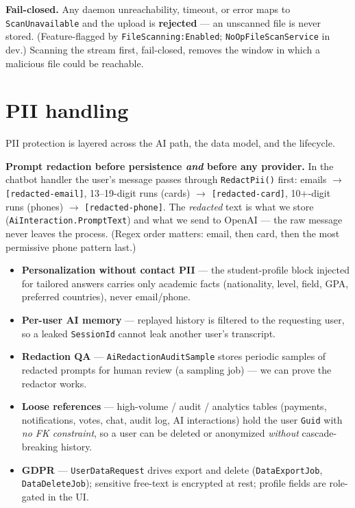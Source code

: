 \documentclass[11pt,a4paper]{article}
\newcommand{\code}[1]{\texttt{\textcolor{spInk}{#1}}}
\begin{document}
\begin{secbox}
\textbf{Fail-closed.} Any daemon unreachability, timeout, or error maps to
\code{ScanUnavailable} and the upload is \textbf{rejected} --- an unscanned file is
never stored. (Feature-flagged by \code{FileScanning:Enabled}; \code{NoOpFileScanService}
in dev.) Scanning the stream first, fail-closed, removes the window in which a
malicious file could be reachable.
\end{secbox}

\section{PII handling}
PII protection is layered across the AI path, the data model, and the lifecycle.

\begin{howbox}
\textbf{Prompt redaction before persistence \emph{and} before any provider.} In
the chatbot handler the user's message passes through \code{RedactPii()} first:
emails $\rightarrow$ \code{[redacted-email]}, 13--19-digit runs (cards)
$\rightarrow$ \code{[redacted-card]}, 10+-digit runs (phones) $\rightarrow$
\code{[redacted-phone]}. The \emph{redacted} text is what we store
(\code{AiInteraction.PromptText}) and what we send to OpenAI --- the raw message
never leaves the process. (Regex order matters: email, then card, then the most
permissive phone pattern last.)
\end{howbox}

\begin{itemize}
\item \textbf{Personalization without contact PII} --- the student-profile block
  injected for tailored answers carries only academic facts (nationality, level,
  field, GPA, preferred countries), never email/phone.
\item \textbf{Per-user AI memory} --- replayed history is filtered to the requesting
  user, so a leaked \code{SessionId} cannot leak another user's transcript.
\item \textbf{Redaction QA} --- \code{AiRedactionAuditSample} stores periodic samples
  of redacted prompts for human review (a sampling job) --- we can prove the
  redactor works.
\item \textbf{Loose references} --- high-volume / audit / analytics tables (payments,
  notifications, votes, chat, audit log, AI interactions) hold the user
  \code{Guid} with \emph{no FK constraint}, so a user can be deleted or anonymized
  \emph{without} cascade-breaking history.
\item \textbf{GDPR} --- \code{UserDataRequest} drives export and delete
  (\code{DataExportJob}, \code{DataDeleteJob}); sensitive free-text is encrypted at
  rest; profile fields are role-gated in the UI.
\end{itemize}
\end{document}
